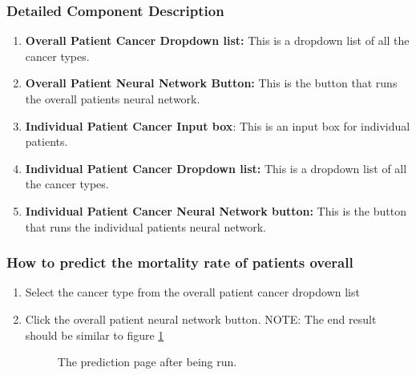 \documentclass[14pt, a4paper]{article}
\begin{document}
	\subsubsection{Detailed Component Description}
		\begin{enumerate}
			\item \textbf{Overall Patient Cancer Dropdown list:} This is a dropdown list of all the cancer types.
			\item \textbf{Overall Patient Neural Network Button:} This is the button that runs the overall patients neural network.
			\item \textbf{Individual Patient Cancer Input box}: This is an input box for individual patients.
			\item \textbf{Individual Patient Cancer Dropdown list:} This is a dropdown list of all the cancer types.
			\item \textbf{Individual Patient Cancer Neural Network button:} This is the button that runs the individual patients neural network.
		\end{enumerate}
	\subsubsection{How to predict the mortality rate of patients overall}
		\begin{enumerate}
			\item Select the cancer type from the overall patient cancer dropdown list
			\item Click the overall patient neural network button. NOTE: The end result should be similar to figure \ref{fig:predict2}
			\begin{figure}[H]
				\centerline{}
				\caption{The prediction page after being run.}
				\label{fig:predict2}
			\end{figure}
		\end{enumerate}
\end{document}
